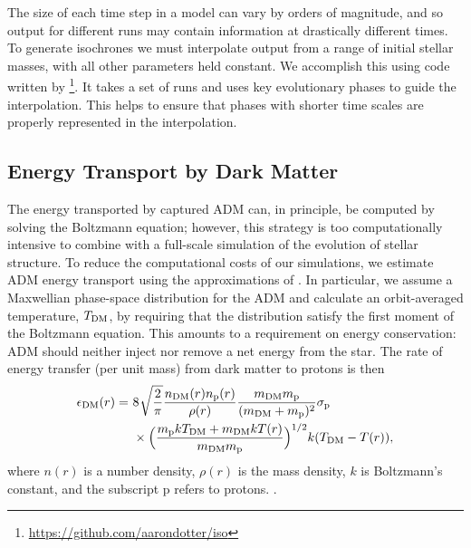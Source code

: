 \documentclass[useAMS,usenatbib]{mnras}
\begin{document}
  The size of each time step in a \mesa model can vary by orders of magnitude, and so output for different \mesa runs may contain information at drastically different times. To generate isochrones we must interpolate output from a range of initial stellar masses, with all other parameters held constant. We accomplish this using code written by \citet{Dotter2016MesaIsochrones}\footnote{\url{https://github.com/aarondotter/iso}}. It takes a set of \mesa runs and uses key evolutionary phases to guide the interpolation. This helps to ensure that phases with shorter time scales are properly represented in the interpolation.

\subsection{Energy Transport by Dark Matter}
\label{sub:energytransport}

  The energy transported by captured ADM can, in principle, be computed by solving the Boltzmann equation; however, this strategy is too computationally intensive to combine with a full-scale simulation of the evolution of stellar structure. To reduce the computational costs of our simulations, we estimate ADM energy transport using the approximations of \citet{Spergel1985EffectInterior}. In particular, we assume a Maxwellian phase-space distribution for the ADM and calculate an orbit-averaged temperature, $T_{\mathrm{DM}}$, by requiring that the distribution satisfy the first moment of the Boltzmann equation. This amounts to a requirement on energy conservation: ADM should neither inject nor remove a net energy from the star. The rate of energy transfer (per unit mass) from dark matter to protons is then
  \begin{align}
  \begin{split}
  \epsilon_{\mathrm{DM}}(r) =\ & 8\ \sqrt[]{\frac{2}{\pi}} \frac{n_{\mathrm{DM}}(r) n_{\mathrm{p}}(r)}{\rho(r)} \frac{m_{\mathrm{DM}} m_{\mathrm{p}}}{(m_{\mathrm{DM}}+m_{\mathrm{p}})^2} \sigma_{\mathrm{p}}\\
  & \times \Big(\frac{m_{\mathrm{p}} k T_{\mathrm{DM}} + m_{\mathrm{DM}} k T(r)}{m_{\mathrm{DM}} m_{\mathrm{p}}}\Big)^{1/2} k (T_{\mathrm{DM}} - T(r)),
  \label{eq:xheat}
  \end{split}
  \end{align}
  where $n(r)$ is a number density, $\rho(r)$ is the mass density, $k$ is Boltzmann's constant, and the subscript p refers to protons. \citep[See][for a detailed derivation]{Spergel1985EffectInterior}.
\end{document}
